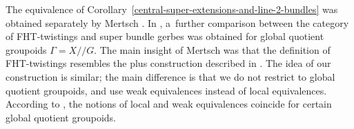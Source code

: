 \documentclass[pdftex]{sigma}
\numberwithin{equation}{section}
\def\act#1#2{#1/\!\!/#2}
\begin{document}
\begin{Remark}
The equivalence of Corollary~\ref{central-super-extensions-and-line-2-bundles} was obtained separately by Mertsch
\cite[Proposition~B.3.7]{Mertsch2020}.
In \cite[Theorem~B.3.13]{Mertsch2020}, a~further comparison between the category of FHT-twistings and super bundle gerbes
was obtained for global quotient groupoids $\Gamma=\act XG$. The main insight of Mertsch was that the definition of FHT-twistings
resembles the plus construction described in {\cite[Proposition 9.1]{nikolaus2}}. The idea of our construction is similar; the main difference is that
we do not restrict to global quotient groupoids, and use weak equivalences instead of local equivalences. According to \cite[Lemma B.3.10]{Mertsch2020}, the notions of local and weak equivalences coincide for certain global quotient groupoids. \end{Remark}
\end{document}
